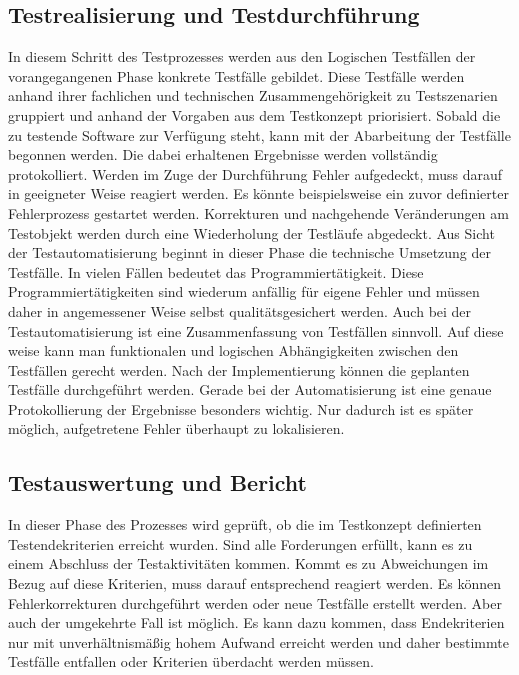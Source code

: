 \subsection{Testrealisierung und Testdurchführung}
\label{subsec:testrealisierung_und_durchführung}
In diesem Schritt des Testprozesses werden aus den Logischen Testfällen der vorangegangenen Phase konkrete Testfälle gebildet.
Diese Testfälle werden anhand ihrer fachlichen und technischen Zusammengehörigkeit zu Testszenarien gruppiert und anhand der Vorgaben aus dem Testkonzept priorisiert.
Sobald die zu testende Software zur Verfügung steht, kann mit der Abarbeitung der Testfälle begonnen werden. Die dabei erhaltenen Ergebnisse werden vollständig protokolliert. Werden im Zuge der Durchführung Fehler aufgedeckt, muss darauf in geeigneter Weise reagiert werden. Es könnte beispielsweise ein zuvor definierter Fehlerprozess gestartet werden.
Korrekturen und nachgehende Veränderungen am Testobjekt werden durch eine Wiederholung der Testläufe abgedeckt.
Aus Sicht der Testautomatisierung beginnt in dieser Phase die technische Umsetzung der Testfälle.
In vielen Fällen bedeutet das Programmiertätigkeit. Diese Programmiertätigkeiten sind wiederum anfällig für eigene Fehler und müssen daher in angemessener Weise selbst qualitätsgesichert werden. Auch bei der Testautomatisierung ist eine Zusammenfassung von Testfällen sinnvoll. Auf diese weise kann man funktionalen und logischen Abhängigkeiten zwischen den Testfällen gerecht werden.
Nach der Implementierung können die geplanten Testfälle durchgeführt werden.
Gerade bei der Automatisierung ist eine genaue Protokollierung der Ergebnisse besonders wichtig.
Nur dadurch ist es später möglich, aufgetretene Fehler überhaupt zu lokalisieren.


\subsection{Testauswertung und Bericht}
\label{subsec:testauswertung_und_bericht}
In dieser Phase des Prozesses wird geprüft, ob die im Testkonzept definierten Testendekriterien erreicht wurden. Sind alle Forderungen erfüllt, kann es zu einem Abschluss der Testaktivitäten kommen. Kommt es zu Abweichungen im Bezug auf diese Kriterien, muss darauf entsprechend reagiert werden. Es können Fehlerkorrekturen durchgeführt werden oder neue Testfälle erstellt werden. Aber auch der umgekehrte Fall ist möglich. Es kann dazu kommen, dass Endekriterien nur mit unverhältnismäßig hohem Aufwand erreicht werden 
und daher bestimmte Testfälle entfallen oder Kriterien überdacht werden müssen.

